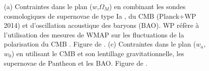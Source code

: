\documentclass[../main/main.tex]{subfiles}
\begin{document}
\begin{figure}[ht]
\centering
{}\hfill
{}
\caption[]{(a) Contraintes dans le plan
  ($w$,$\Omega_{M}$) en combinant les sondes
  cosmologiques de supernovae de type Ia \citep[JLA,][]{Betoule2014}, du CMB (Planck+WP 2014) et d'oscillation
  acoustique des baryons (BAO). WP réfère à l'utilisation des mesures de
  WMAP sur les fluctuations de la polarisation du CMB \citep{Bennett2013}. Figure de \citet{Betoule2014}. (c)
  Contraintes dans le plan ($w_{a}$,$w_{0}$) en utilisant le
  CMB et son lentillage gravitationnelle, les supernovae de Pantheon
  \citep{Scolnicpantheon18} et les BAO. Figure de \citet{Planckparams2018}.}
\label{fig:darkenergy}
\end{figure}



\end{document}
